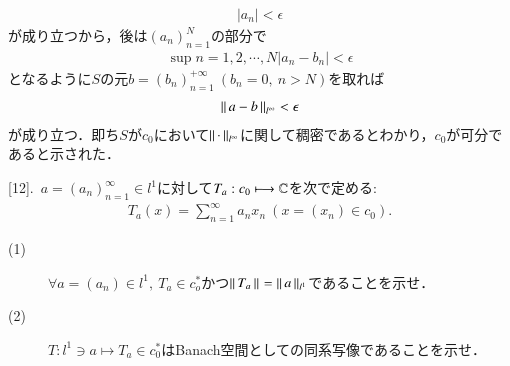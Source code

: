 \begin{prf}
\begin{description}
		\begin{align}
			|a_n| < \epsilon
		\end{align}
		が成り立つから，後は$(a_n)_{n=1}^{N}$の部分で
		\begin{align}
			\sup{n=1,2,\cdots,N}{|a_n - b_n|} < \epsilon
		\end{align}
		となるように$S$の元$b=(b_n)_{n=1}^{+\infty}\ (b_n = 0,\ n>N)$を取れば
		\begin{align}
			\left\|\, a - b\, \right\|_{l^{\infty}} < \epsilon
		\end{align}
		が成り立つ．即ち$S$が$c_0$において$\left\|\, \cdot\, \right\|_{l^{\infty}}$に関して稠密であるとわかり，$c_0$が可分であると示された．
		\QED
\end{description}
\end{prf}

[12].\ $a = (a_n)_{n=1}^{\infty} \in l^1$に対して$T_a:c_0 \longmapsto \mathbb{C}$を次で定める:
	\begin{align}
		T_a(x) = \sum_{n=1}^{\infty}a_n x_n\ (x=(x_n) \in c_0).
	\end{align}
	\begin{description}
		\item[(1)] $\forall a = (a_n) \in l^1,\ T_a \in c_o^*$かつ$\left\|\, T_a\, \right\|_{} = \left\|\, a\, \right\|_{l^1}$であることを示せ．
		\item[(2)] $T:l^1 \ni a \longmapsto T_a \in c_0^*$はBanach空間としての同系写像であることを示せ．
	\end{description}

